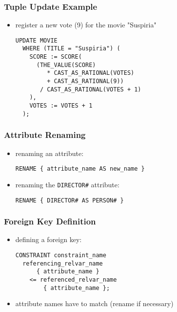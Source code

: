 \documentclass[dvipsnames]{beamer}
\theoremstyle{plain}
\begin{document}
\begin{frame}[fragile]
  \frametitle{Tuple Update Example}

  \begin{itemize}
    \item register a new vote (9) for the movie "Suspiria"
    \begin{lstlisting}
UPDATE MOVIE
  WHERE (TITLE = "Suspiria") (
    SCORE := SCORE(
      (THE_VALUE(SCORE)
         * CAST_AS_RATIONAL(VOTES)
         + CAST_AS_RATIONAL(9))
       / CAST_AS_RATIONAL(VOTES + 1)
    ),
    VOTES := VOTES + 1
  );
    \end{lstlisting}
  \end{itemize}
\end{frame}

\begin{frame}[fragile]
  \frametitle{Attribute Renaming}

  \begin{itemize}
    \item renaming an attribute:
    \begin{lstlisting}
RENAME { attribute_name AS new_name }
    \end{lstlisting}
  \end{itemize}

  \begin{example}
    \begin{itemize}
      \item renaming the \texttt{DIRECTOR\#} attribute:
      \begin{lstlisting}
RENAME { DIRECTOR# AS PERSON# }
      \end{lstlisting}
    \end{itemize}
  \end{example}
\end{frame}

\begin{frame}[fragile]
  \frametitle{Foreign Key Definition}

  \begin{itemize}
    \item defining a foreign key:
    \begin{lstlisting}
CONSTRAINT constraint_name
  referencing_relvar_name
      { attribute_name }
    <= referenced_relvar_name
        { attribute_name };
    \end{lstlisting}

    \item attribute names have to match (rename if necessary)
  \end{itemize}
\end{frame}
\end{document}
